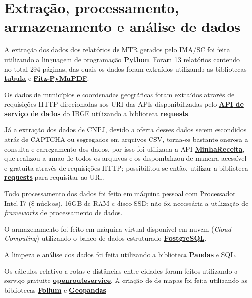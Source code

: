 \section{Extração, processamento, armazenamento e análise de dados}

A extração dos dados dos relatórios de \gls{MTR} gerados pelo \gls{IMA/SC} foi feita utilizando a linguagem de programação \href{https://www.python.org/}{\textbf{Python}}. Foram 13 relatórios contendo no total 294 páginas, das quais os dados foram extraídos utilizando as bibliotecas \href{https://tabula.technology/}{\textbf{tabula}} e \href{https://pymupdf.readthedocs.io/en/latest/}{\textbf{Fitz-PyMuPDF}}.

Os dados de municípios e coordenadas geográficas foram extraídos através de requisições \gls{HTTP} direcionadas aos \gls{URI} das \gls{API}s disponibilizadas pelo \href{https://servicodados.ibge.gov.br/api/docs/}{\textbf{\gls{API} de serviço de dados}} do \gls{IBGE} utilizando a biblioteca \href{https://pypi.org/project/requests/}{\textbf{requests}}.

Já a extração dos dados de \gls{CNPJ}, devido a oferta desses dados serem escondidos atrás de \gls{CAPTCHA} ou segregados em arquivos \gls{CSV}, torna-se bastante onerosa a consulta e carregamento dos dados, por isso foi utilizada a \gls{API} \href{https://docs.minhareceita.org/}{\textbf{MinhaReceita}}, que realizou a união de todos os arquivos e os disponibilizou de maneira acessível e gratuita através de requisições \gls{HTTP}; possibilitou-se então, utilizar a biblioteca \href{https://pypi.org/project/requests/}{\textbf{requests}} para requisitar ao \gls{URI}.

Todo processamento dos dados foi feito em máquina pessoal com Processador Intel I7 (8 núcleos), 16GB de \gls{RAM} e disco \gls{SSD}; não foi necessária a utilização de \textit{frameworks} de processamento de dados.

O armazenamento foi feito em máquina virtual disponível em nuvem (\textit{Cloud Computing}) utilizando o banco de dados estruturado \href{https://www.postgresql.org/}{\textbf{PostgreSQL}}.

A limpeza e análise dos dados foi feita utilizando a biblioteca \href{https://pandas.pydata.org/}{\textbf{Pandas}} e \gls{SQL}.

Os cálculos relativo a rotas e distâncias entre cidades foram feitos utilizando o serviço gratuito \href{https://openrouteservice.org/}{\textbf{openrouteservice}}. A criação de de mapas foi feita utilizando as bibliotecas \href{https://pypi.org/project/folium/}{\textbf{Folium}} e \href{https://geopandas.org/en/stable/}{\textbf{Geopandas}}

